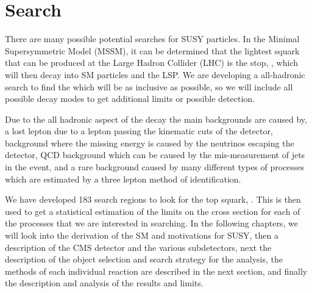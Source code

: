 \section{Search}
\label{sec:search}

There are many possible potential searches for SUSY particles. In the Minimal Supersymmetric Model (MSSM), it can be determined that the lightest squark that can be produced at the Large Hadron Collider (LHC) is the stop, \st{}, which will then decay into SM particles and the LSP.  We are developing a all-hadronic search to find the \st{} which will be as inclusive as possible, so we will include all possible decay modes to get additional limits or possible detection. 

Due to the all hadronic aspect of the decay the main backgrounds are caused by, a lost lepton due to a lepton passing the kinematic cuts of the detector, \Znunu{} background where the missing energy is caused by the neutrinos escaping the detector, QCD background which can be caused by the mis-measurement of jets in the event, and a rare background caused by many different types of processes which are estimated by a three lepton method of identification. 

We have developed 183 search regions to look for the top squark, \st{}. This is then used to get a statistical estimation of the limits on the cross section for each of the processes that we are interested in searching. In the following chapters, we will look into the derivation of the SM and motivations for SUSY, then a description of the CMS detector and the various subdetectors, next the description of the object selection and search strategy for the analysis, the methods of each individual reaction are described in the next section, and finally the description and analysis of the results and limits. 

